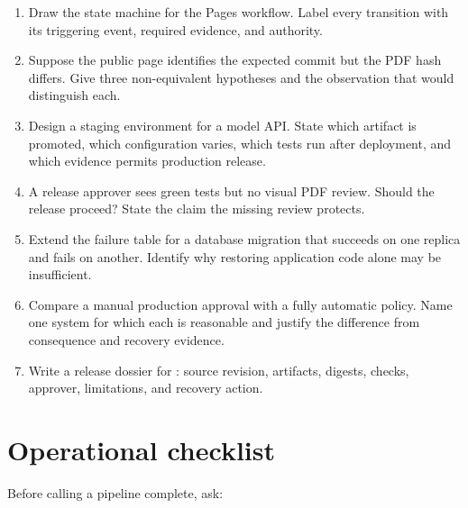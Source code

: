 \begin{enumerate}
  \item Draw the state machine for the Pages workflow. Label every transition
  with its triggering event, required evidence, and authority.
  \item Suppose the public page identifies the expected commit but the PDF hash
  differs. Give three non-equivalent hypotheses and the observation that would
  distinguish each.
  \item Design a staging environment for a model API. State which artifact is
  promoted, which configuration varies, which tests run after deployment, and
  which evidence permits production release.
  \item A release approver sees green tests but no visual PDF review. Should the
  release proceed? State the claim the missing review protects.
  \item Extend the failure table for a database migration that succeeds on one
  replica and fails on another. Identify why restoring application code alone
  may be insufficient.
  \item Compare a manual production approval with a fully automatic policy.
  Name one system for which each is reasonable and justify the difference from
  consequence and recovery evidence.
  \item Write a release dossier for : source revision,
  artifacts, digests, checks, approver, limitations, and recovery action.
\end{enumerate}

\section{Operational checklist}

Before calling a pipeline complete, ask:

